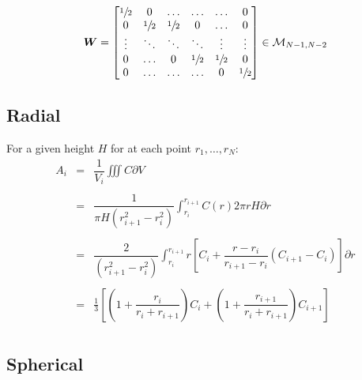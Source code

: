 \documentclass[aps,onecolumn,11pt]{revtex4}
\newcommand{\half}{{\sfrac{1}{2}}}
\newcommand{\mat}[1]{{\bm{#1}}}
\begin{document}
\begin{equation}
	\mat{W} = 
	\begin{bmatrix}
	\half & 0     & \ldots &\ldots & \ldots & 0 \\
	 0    & \half & \half & 0     & \ldots & 0 \\
	 \vdots & \ddots & \ddots & \ddots & \vdots & \vdots \\
	 0      & \ldots & 0& \half& \half  &  0     \\ 
	 0      & \ldots & \ldots & \ldots &  0 & \half \\                
	\end{bmatrix} \in \mathcal{M}_{N-1,N-2}
\end{equation}




\subsection{Radial}

For a given height $H$ for at each point $r_1,\ldots,r_N$:
\begin{equation}
\begin{array}{rcl}
	A_i & = & \displaystyle\dfrac{1}{V_i} \iiint C \partial V \\
	\\
	& = & \displaystyle \dfrac{1}{\pi H \left( r_{i+1}^2 - r_{i}^2 \right)} \int_{r_i}^{r_{i+1}} C(r) 2\pi r H \partial r\\
	\\
	& = & \displaystyle \dfrac{2}{\left( r_{i+1}^2 - r_{i}^2 \right)} \int_{r_i}^{r_{i+1}}   r \left[ C_{i} + \dfrac{r-r_i}{r_{i+1}-r_i} \left(C_{i+1}-C_{i}\right) \right]  \partial r\\ \\
	& = & \displaystyle \frac{1}{3} \left[ \left(1+\dfrac{r_i}{r_i+r_{i+1}}\right) C_i + \left(1+\dfrac{r_{i+1}}{r_i+r_{i+1}}\right) C_{i+1} \right]\\\
\end{array}
\end{equation} 

\subsection{Spherical}
\end{document}
